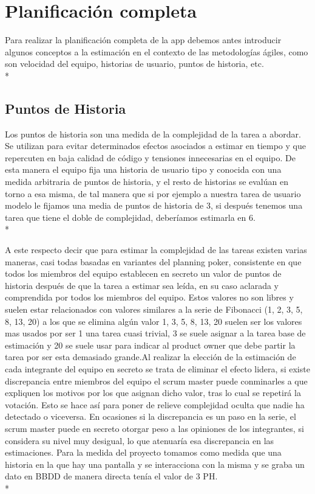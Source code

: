 \documentclass[../pfc.tex]{subfiles}
\begin{document}
	\section{Planificación completa}
	
	Para realizar la planificación completa de la app debemos antes introducir algunos conceptos a la estimación en el contexto de las metodologías ágiles, como son velocidad del equipo, historias de usuario, puntos de historia, etc.\\*   
	
	\subsection{Puntos de Historia}
	
	Los puntos de historia son una medida de la complejidad de la tarea a abordar. Se utilizan para evitar determinados efectos asociados a estimar en tiempo y que repercuten en baja calidad de código y tensiones innecesarias en el equipo. De esta manera el equipo fija una historia de usuario tipo y conocida con una medida arbitraria de puntos de historia, y el resto de historias se evalúan en torno a esa misma, de tal manera que si por ejemplo a nuestra tarea de usuario modelo le fijamos una media de puntos de historia de 3, si después tenemos una tarea que tiene el doble de complejidad, deberíamos estimarla en 6.\\*
	
	A este respecto decir que para estimar la complejidad de las tareas existen varias maneras, casi todas basadas en variantes  del planning poker, consistente en que todos los miembros del equipo establecen en secreto un valor de puntos de historia después de que la tarea a estimar sea leída, en su caso aclarada y comprendida por todos los miembros del equipo. Estos valores no son libres y suelen estar relacionados con valores similares a la serie de Fibonacci (1, 2, 3, 5, 8, 13, 20) a los que se elimina algún valor 1, 3, 5, 8, 13, 20 suelen ser los valores mas usados por ser 1 una tarea cuasi trivial, 3 se suele asignar a la tarea base de estimación y 20 se suele usar para indicar al product owner que debe partir la tarea por ser esta demasiado grande.Al realizar la elección de la estimación de cada integrante del equipo en secreto se trata de eliminar el efecto lidera, si existe discrepancia entre miembros del equipo el scrum master puede conminarles a que expliquen los motivos por los que asignan dicho valor, tras lo cual se repetirá la votación. Esto se hace así para poner de relieve complejidad oculta que nadie ha detectado o viceversa. En ocasiones si la discrepancia es un paso en la serie, el scrum master puede en secreto otorgar peso a las opiniones de los integrantes, si considera su nivel muy desigual, lo que atenuaría esa discrepancia en las estimaciones. Para la medida del proyecto tomamos como medida que una historia en la que hay una pantalla y se interacciona con la misma y se graba un dato en BBDD de manera directa tenía el valor de 3 PH.\\*
	
\end{document}
